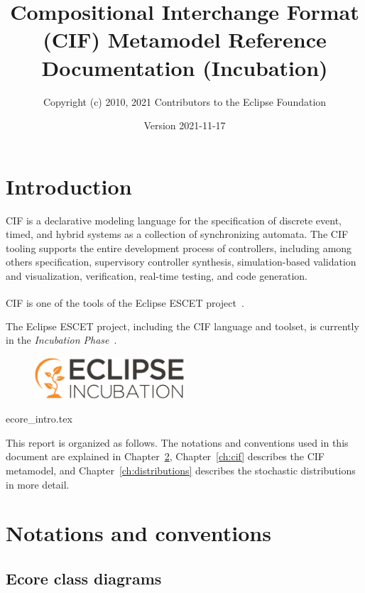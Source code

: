 \documentclass{report}
\title{Compositional Interchange Format (CIF) Metamodel Reference Documentation (Incubation)}
\author{Copyright (c) 2010, 2021 Contributors to the Eclipse Foundation}
\date{Version 2021-11-17}
\begin{document}
\maketitle
\tableofcontents

\chapter{Introduction}
CIF is a declarative modeling language for the specification of discrete
event, timed, and hybrid systems as a collection of synchronizing automata.
The CIF tooling supports the entire development process of controllers,
including among others specification, supervisory controller synthesis,
simulation-based validation and visualization, verification, real-time
testing, and code generation.

CIF is one of the tools of the Eclipse ESCET\textsuperscript{\texttrademark{}}
project~\cite{Eclipse:ESCET}.

The Eclipse ESCET project, including the CIF language and toolset, is
currently in the \emph{Incubation Phase}~\cite{Eclipse:Incubation}.
\begin{figure}[H]
  \centering
  \includegraphics[width=0.5\textwidth]{figures/eclipse-incubation.png}
\end{figure}


       {ecore_intro.tex}

This report is organized as follows. The notations and conventions used in
this document are explained in Chapter~\ref{ch:notations-conventions},
Chapter~\ref{ch:cif} describes the CIF metamodel, and
Chapter~\ref{ch:distributions} describes the stochastic distributions in more
detail.


\chapter{Notations and conventions}\label{ch:notations-conventions}

\section{Ecore class diagrams}
\end{document}
